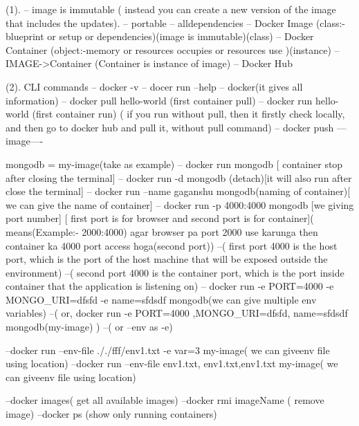 (1).
-- image is immutable ( instead you can create a new version of the image that includes the updates).
-- portable
-- alldependencies
-- Docker Image (class:-blueprint or setup or dependencies)(image is immutable)(class)
-- Docker Container (object:-memory or resources occupies or resources use )(instance)
-- IMAGE->Container (Container is instance of image)
-- Docker Hub

(2). CLI commands
-- docker -v
-- docer run --help
-- docker(it gives all information)
-- docker pull hello-world (first container pull)
-- docker run hello-world (first container run) ( if you run without pull, then it firstly check locally, and then go to docker hub and pull it, without pull command)
-- docker push ---image----

mongodb = my-image(take as example)
-- docker run mongodb [ container stop after closing the terminal]
-- docker run -d mongodb (detach)[it will also run after close the terminal]
-- docker run --name gaganshu mongodb(naming of container)[ we can give the name of container]
-- docker run -p 4000:4000 mongodb [we giving port number]  [ first port is for browser and second port is for container]( means(Example:- 2000:4000) agar browser pa port 2000 use karunga then container ka 4000 port access hoga(second port))
    --( first port 4000 is the host port, which is the port of the host machine  that will be exposed outside the environment)
    --( second port 4000 is the container port, which is the port inside container that the application is listening on)
-- docker run -e PORT=4000 -e MONGO_URI=dfsfd -e name=sfdsdf mongodb(we can give multiple env variables)
    --( or, docker run -e PORT=4000 ,MONGO_URI=dfsfd, name=sfdsdf mongodb(my-image) )
    --( or --env as -e)

--docker run --env-file ././fff/env1.txt -e var=3 my-image( we can giveenv file using location)
--docker run --env-file env1.txt, env1.txt,env1.txt  my-image( we can giveenv file using location)

--docker images( get all available images)
--docker rmi imageName ( remove image)
--docker ps (show only running containers)